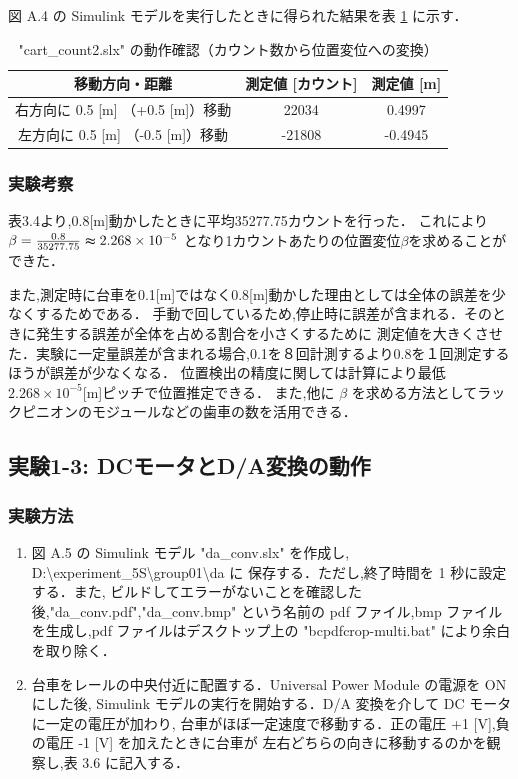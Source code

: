 図 A.4 の Simulink モデルを実行したときに得られた結果を表 \ref{tab:exp_1_2b} に示す．

\begin{table}[h]
  \centering
  \caption{"cart\_count2.slx" の動作確認（カウント数から位置変位への変換）}
  \label{tab:exp_1_2b}
  \begin{tabular}{|c|c|c|}
    \hline
    移動方向・距離                    & 測定値 [カウント] & 測定値 [m] \\
    \hline
    右方向に 0.5 [m] （+0.5 [m]）移動 & 22034             & 0.4997     \\
    \hline
    左方向に 0.5 [m] （-0.5 [m]）移動 & -21808            & -0.4945    \\
    \hline
  \end{tabular}
\end{table}

\subsubsection{実験考察}
表3.4より,0.8[m]動かしたときに平均35277.75カウントを行った．
これにより\( \beta =  \frac{0.8}{35277.75}\thickapprox 2.268\times 10^{-5}\)
となり1カウントあたりの位置変位\( \beta \)を求めることができた．

また,測定時に台車を0.1[m]ではなく0.8[m]動かした理由としては全体の誤差を少なくするためである．
手動で回しているため,停止時に誤差が含まれる．そのときに発生する誤差が全体を占める割合を小さくするために
測定値を大きくさせた．実験に一定量誤差が含まれる場合,0.1を８回計測するより0.8を１回測定するほうが誤差が少なくなる．
位置検出の精度に関しては計算により最低\(2.268\times 10^{-5}\)[m]ピッチで位置推定できる．
また,他に \(\beta\) を求める方法としてラックピニオンのモジュールなどの歯車の数を活用できる．

\subsection{実験1-3: DCモータとD/A変換の動作}

\subsubsection{実験方法}
\begin{enumerate}
  \item 図 A.5 の Simulink モデル "da\_conv.slx" を作成し,
        D:\textbackslash experiment\_5S\textbackslash group01\textbackslash da に
        保存する．ただし,終了時間を 1 秒に設定する．また,
        ビルドしてエラーがないことを確認した後,"da\_conv.pdf","da\_conv.bmp" という名前の
        pdf ファイル,bmp ファイルを生成し,pdf ファイルはデスクトップ上の 
        "bcpdfcrop-multi.bat" により余白を取り除く．
        
  \item 台車をレールの中央付近に配置する．Universal Power Module の電源を ON にした後,
        Simulink モデルの実行を開始する．D/A 変換を介して DC モータに一定の電圧が加わり,
        台車がほぼ一定速度で移動する．正の電圧 +1 [V],負の電圧 -1 [V] を加えたときに台車が
        左右どちらの向きに移動するのかを観察し,表 3.6 に記入する．
        
\end{enumerate}

